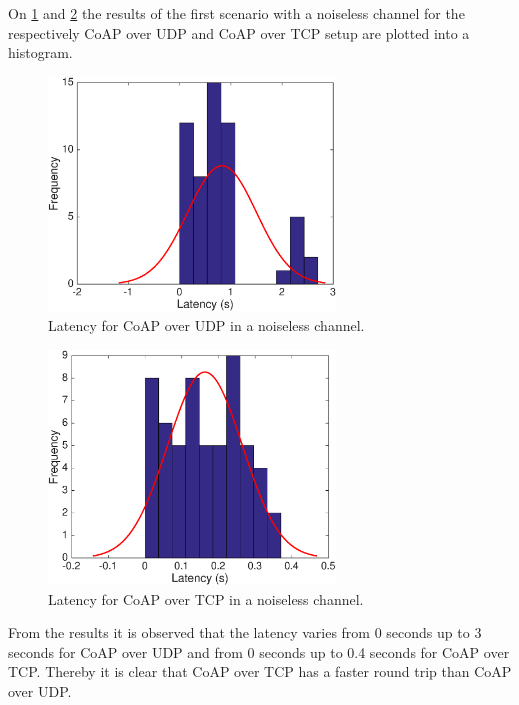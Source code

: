 On \figurename{\ref{fig:coapconlatency}} and \figurename{\ref{fig:coaptcplatency}} the results of the first scenario with a noiseless channel for the respectively CoAP over UDP and CoAP over TCP setup are plotted into a histogram. 
\begin{figure}[bht]
	\centering
	\includegraphics[width=3in]{gfx/coapoverudp}
	\caption{Latency for CoAP over UDP in a noiseless channel.}
	\label{fig:coapconlatency}
\end{figure}
\begin{figure}[bht]
	\centering
	\includegraphics[width=3in]{gfx/coapovertcp}
	\caption{Latency for CoAP over TCP in a noiseless channel.}
	\label{fig:coaptcplatency}
\end{figure}

From the results it is observed  that the latency varies from 0 seconds up to 3 seconds for CoAP over UDP and from 0 seconds up to 0.4 seconds for CoAP over TCP. Thereby it is clear that CoAP over TCP has a faster round trip than CoAP over UDP. 



